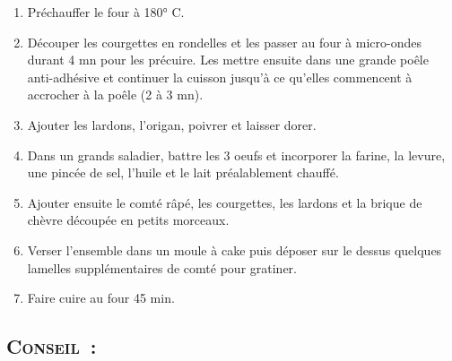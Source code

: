 \begin{enumerate}
\item Pr\'echauffer le four \`a 180° C.

\item D\'ecouper les courgettes en rondelles et les passer au four \`a micro-ondes durant 4 mn pour les pr\'ecuire. Les mettre ensuite dans une grande po\^ele anti-adh\'esive et continuer la cuisson jusqu'\`a ce qu'elles commencent \`a accrocher \`a la po\^ele (2 \`a 3 mn). 

\item Ajouter les lardons, l'origan, poivrer et laisser dorer.

\item Dans un grands saladier, battre les 3 oeufs et incorporer la farine, la levure, une pinc\'ee de sel, l'huile et le lait pr\'ealablement chauff\'e.

\item Ajouter ensuite le comt\'e r\^ap\'e, les courgettes, les lardons et la brique de ch\`evre d\'ecoup\'ee en petits morceaux. 

\item Verser l'ensemble dans un moule \`a cake puis d\'eposer sur le dessus quelques lamelles suppl\'ementaires de comt\'e pour gratiner.

\item Faire cuire au four 45 min.

\end{enumerate}
\subsection*{\textsc{Conseil~:}}

